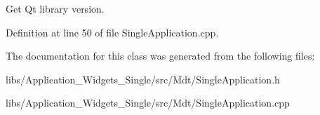 Get Qt library version. 



Definition at line 50 of file Single\+Application.\+cpp.



The documentation for this class was generated from the following files\+:\begin{DoxyCompactItemize}
\item 
libs/\+Application\+\_\+\+Widgets\+\_\+\+Single/src/\+Mdt/Single\+Application.\+h\item 
libs/\+Application\+\_\+\+Widgets\+\_\+\+Single/src/\+Mdt/Single\+Application.\+cpp\end{DoxyCompactItemize}
